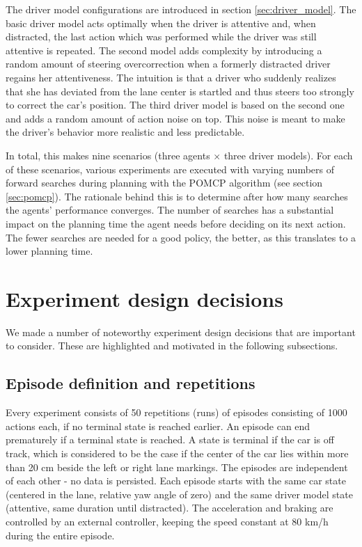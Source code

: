 The driver model configurations are introduced in section \ref{sec:driver_model}. The basic driver model acts optimally when the driver is attentive and, when distracted, the last action which was performed while the driver was still attentive is repeated. The second model adds complexity by introducing a random amount of steering overcorrection when a formerly distracted driver regains her attentiveness. The intuition is that a driver who suddenly realizes that she has deviated from the lane center is startled and thus steers too strongly to correct the car's position. The third driver model is based on the second one and adds a random amount of action noise on top. This noise is meant to make the driver's behavior more realistic and less predictable.

In total, this makes nine scenarios (three agents $\times$ three driver models). For each of these scenarios, various experiments are executed with varying numbers of forward searches during planning with the POMCP algorithm (see section \ref{sec:pomcp}). The rationale behind this is to determine after how many searches the agents' performance converges. The number of searches has a substantial impact on the planning time the agent needs before deciding on its next action. The fewer searches are needed for a good policy, the better, as this translates to a lower planning time.

\section{Experiment design decisions}
\label{sec:design_decisions}
We made a number of noteworthy experiment design decisions that are important to consider. These are highlighted and motivated in the following subsections.

\subsection{Episode definition and repetitions}

Every experiment consists of 50 repetitions (runs) of episodes consisting of 1000 actions each, if no terminal state is reached earlier. An episode can end prematurely if a terminal state is reached. A state is terminal if the car is off track, which is considered to be the case if the center of the car lies within more than 20 cm beside the left or right lane markings. The episodes are independent of each other - no data is persisted. Each episode starts with the same car state (centered in the lane, relative yaw angle of zero) and the same driver model state (attentive, same duration until distracted). The acceleration and braking are controlled by an external controller, keeping the speed constant at 80 km/h during the entire episode.

